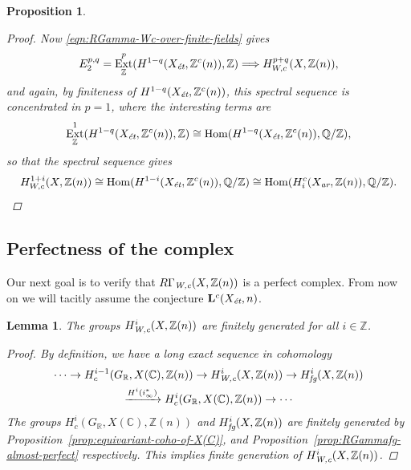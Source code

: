 \documentclass[leqno,12pt]{article}
\theoremstyle{plain}
\newtheorem{lemma}[theorem]{\indent\sc Lemma}
\newtheorem{proposition}[theorem]{\indent\sc Proposition}
\theoremstyle{definition}
\DeclareMathOperator{\Hom}{Hom}
\DeclareMathOperator{\Ext}{Ext}
\newcommand{\CC}{\mathbb{C}}
\newcommand{\QQ}{\mathbb{Q}}
\newcommand{\RR}{\mathbb{R}}
\newcommand{\ZZ}{\mathbb{Z}}
\newcommand{\Wc}{\text{\it W,c}}
\newcommand{\ar}{\text{\it ar}}
\newcommand{\et}{\text{\it \'{e}t}}
\newcommand{\fg}{\text{\it fg}}
\begin{document}
\begin{proposition}
\begin{proof}
    Now \eqref{eqn:RGamma-Wc-over-finite-fields} gives
    \begin{equation}
      \label{eqn:RGamma-Wc-over-finite-fields-ss}
      E_2^{p,q} = \Ext_\ZZ^p (H^{1-q} (X_\et, \ZZ^c (n)), \ZZ) \Longrightarrow
      H^{p+q}_{W,c} (X, \ZZ (n)),
    \end{equation}
    and again, by finiteness of $H^{1-q} (X_\et, \ZZ^c (n))$, this spectral
    sequence is concentrated in $p = 1$, where the interesting terms are
    \[ \Ext_\ZZ^1 (H^{1-q} (X_\et, \ZZ^c (n)), \ZZ) \cong
      \Hom (H^{1-q} (X_\et, \ZZ^c (n)), \QQ/\ZZ), \]
    so that the spectral sequence gives
    \[ H^{1+i}_{W,c} (X, \ZZ (n)) \cong
      \Hom (H^{1-i} (X_\et, \ZZ^c (n)), \QQ/\ZZ) \cong
      \Hom (H_i^c (X_\ar, \ZZ (n)), \QQ/\ZZ). \qedhere \]
  \end{proof}
\end{proposition}

\subsection*{Perfectness of the complex}

Our next goal is to verify that $R\Gamma_\Wc (X, \ZZ(n))$ is a perfect
complex. From now on we will tacitly assume the conjecture
$\mathbf{L}^c (X_\et,n)$.

\begin{lemma}
  The groups $H^i_\Wc (X, \ZZ(n))$ are finitely generated for all $i \in \ZZ$.

  \begin{proof}
    By definition, we have a long exact sequence in cohomology
    \begin{multline*}
      \cdots \to H^{i-1}_c (G_\RR, X (\CC), \ZZ (n)) \to
      H^i_\Wc (X,\ZZ(n)) \to
      H^i_\fg (X,\ZZ(n)) \\
      \xrightarrow{H^i (i_\infty^*)}
      H^i_c (G_\RR, X (\CC), \ZZ (n)) \to \cdots
    \end{multline*}
    The groups $H^i_c (G_\RR, X (\CC), \ZZ (n))$ and $H^i_\fg (X, \ZZ(n))$ are
    finitely generated by
    Proposition~\ref{prop:equivariant-coho-of-X(C)}, and
    Proposition~\ref{prop:RGammafg-almost-perfect} respectively.  This implies
    finite generation of $H^i_\Wc (X, \ZZ(n))$.
  \end{proof}
\end{lemma}
\end{document}
